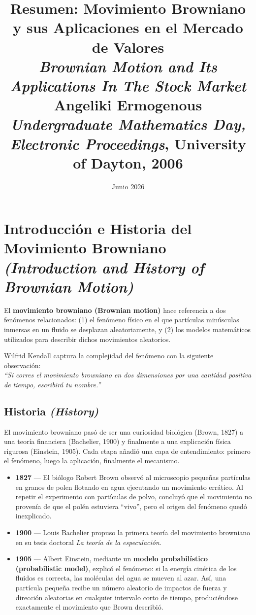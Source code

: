 \documentclass[12pt]{article}
\title{\textbf{Resumen: Movimiento Browniano y sus Aplicaciones en el Mercado de Valores}\\[4pt]
\large \textit{Brownian Motion and Its Applications In The Stock Market}\\[4pt]
\normalsize Angeliki Ermogenous\\
\small \textit{Undergraduate Mathematics Day, Electronic Proceedings}, University of Dayton, 2006}
\author{}
\date{Junio 2026}
\begin{document}
\maketitle
\tableofcontents
\newpage

\section{Introducci\'on e Historia del Movimiento Browniano
\textit{(Introduction and History of Brownian Motion)}}

El \textbf{movimiento browniano (Brownian motion)} hace referencia a dos fen\'omenos relacionados:
(1) el fen\'omeno f\'isico en el que part\'iculas min\'usculas inmersas en un fluido se desplazan aleatoriamente, y
(2) los modelos matem\'aticos utilizados para describir dichos movimientos aleatorios.

Wilfrid Kendall captura la complejidad del fen\'omeno con la siguiente observaci\'on:\\
\textit{``Si corres el movimiento browniano en dos dimensiones por una cantidad positiva de tiempo, escribir\'a tu nombre.''}

\subsection{Historia \textit{(History)}}

\begin{intuicion}
El movimiento browniano pas\'o de ser una curiosidad biol\'ogica (Brown, 1827) a una teor\'ia financiera (Bachelier, 1900) y finalmente a una explicaci\'on f\'isica rigurosa (Einstein, 1905). Cada etapa a\~nadi\'o una capa de entendimiento: primero el fen\'omeno, luego la aplicaci\'on, finalmente el mecanismo.
\end{intuicion}

\begin{itemize}
  \item \textbf{1827} --- El bi\'ologo Robert Brown observ\'o al microscopio peque\~nas part\'iculas en granos de polen flotando en agua ejecutando un movimiento err\'atico. Al repetir el experimento con part\'iculas de polvo, concluy\'o que el movimiento no proven\'ia de que el pol\'en estuviera ``vivo'', pero el origen del fen\'omeno qued\'o inexplicado.

  \item \textbf{1900} --- Louis Bachelier propuso la primera teor\'ia del movimiento browniano en su tesis doctoral \textit{La teor\'ia de la especulaci\'on}.

  \item \textbf{1905} --- Albert Einstein, mediante un \textbf{modelo probabil\'istico (probabilistic model)}, explic\'o el fen\'omeno: si la energ\'ia cin\'etica de los fluidos es correcta, las mol\'eculas del agua se mueven al azar. As\'i, una part\'icula peque\~na recibe un n\'umero aleatorio de impactos de fuerza y direcci\'on aleatorias en cualquier intervalo corto de tiempo, produci\'endose exactamente el movimiento que Brown describi\'o.
\end{itemize}
\end{document}
